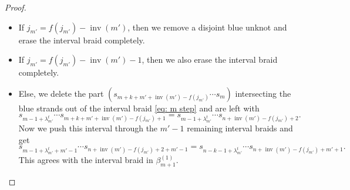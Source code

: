 \documentclass[10pt,a4paper]{amsart}
\DeclareMathOperator{\inv}{inv}
\begin{document}
\begin{proof}
\begin{itemize}
\item[-] If $j_{m'} = f(j_{m'}) - \inv(m')$, then we remove a disjoint blue unknot and erase the interval braid completely.
\item[-] If $j_{m'} = f(j_{m'}) - \inv(m') - 1$, then we also erase the interval braid completely.
\item[-] Else, we delete the part $(s_{m+k+m'+\inv(m')-f(j_{m'})}\cdots s_{m})$ intersecting the blue strands out of the interval braid \eqref{eq: m step} and are left with 
\[
s_{m-1+\lambda^{t}_{m'}}\cdots s_{m+k+m'+\inv(m')-f(j_{m'})+1} = s_{m-1+\lambda^{t}_{m'}}\cdots s_{n+\inv(m')-f(j_{m'}) + 2}.
\]
Now we push this interval through the $m' - 1$ remaining interval braids and get
\begin{equation}\label{eq: push before substract}
s_{m-1+\lambda^{t}_{m'}+m'-1}\cdots s_{n+\inv(m')-f(j_{m'}) + 2+m'-1}=
s_{n-k-1+\lambda^{t}_{m'}}\cdots s_{n+\inv(m')-f(j_{m'}) + m'+1}.
\end{equation}
This agrees with the interval braid in $\beta^{(1)}_{m+1}$.
\end{itemize}
\end{proof}
\end{document}
